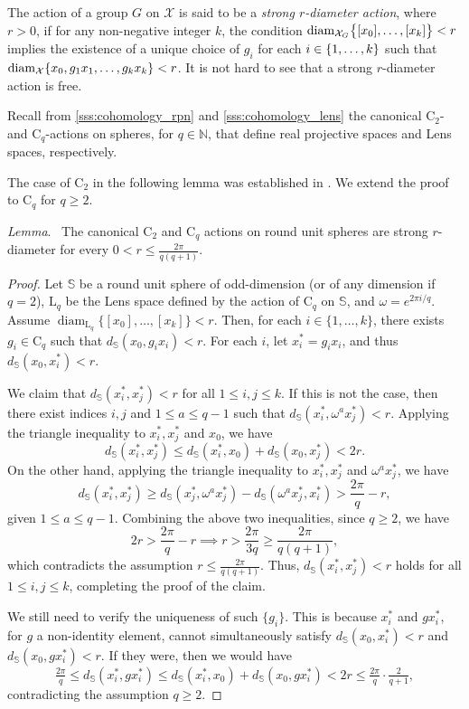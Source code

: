 \documentclass{amsart}
\makeatletter
\renewcommand\subsubsection{\@startsection{subsubsection}{3}
	\z@{.5\linespacing\@plus.7\linespacing}{0em}
	{\normalfont\itshape}}
\theoremstyle{definition}
\newcommand{\N}{\mathbb{N}}
\newcommand{\cyc}{\mathrm{C}}
\DeclarePairedDelimiter\set{\{}{\}}
\newcommand{\rL}{\mathrm{L}}
\newcommand{\cX}{\mathcal{X}}
\newcommand{\bS}{\mathbb{S}}
\newcommand{\darkblue}{\color{darkblue}}
\newcommand{\defn}[1]{{\darkblue \emph{#1}}}
\renewcommand{\lemma}{\medskip\noindent\textit{\darkblue Lemma}.\ }
\theoremstyle{theorem}
\newcommand{\diam}{\operatorname{diam}}
\providecommand{\DIFaddtex}[1]{{\protect\color{blue}\uwave{#1}}} %
\providecommand{\DIFdeltex}[1]{{\protect\color{red}\sout{#1}}}                      %
\providecommand{\DIFadd}[1]{\texorpdfstring{\DIFaddtex{#1}}{#1}} %
\providecommand{\DIFdel}[1]{\texorpdfstring{\DIFdeltex{#1}}{}} %
\renewcommand{\DIFadd}[1]{{\color{red}#1}}
\renewcommand{\DIFdel}[1]{{\color{deletedpurple}\ifmmode\oldmath{#1}\else\sout{#1}\fi}}
\newcommand{\oldmath}[1]{{\color{deletedpurple}\mathpalette\horizontalstrike{#1}}}
\newcommand{\horizontalstrike}[2]{\sbox0{$#1#2$}\rlap{\raisebox{.5\ht0}{\rule{\wd0}{.4pt}}}\usebox0}
\makeatother
\begin{document}
\subsubsection{}\label{sss:strong_r_action}

The action of a group $G$ on $\cX$ is said to be a \defn{strong $r$-diameter action}, where $r > 0$, if for any non-negative integer $k$, the condition $\diam_{\cX_G}\set[\big]{[x_0],\dots,[x_k]} < r$ implies the existence of a unique choice of $g_i$ for each $i \in \set{1,\dots,k}$ such that $\diam_{\cX}\set{x_0, g_1x_1, \dots, g_kx_k} < r$.
It is not hard to see that a strong $r$-diameter action is free.

Recall from \cref{sss:cohomology_rpn} and \cref{sss:cohomology_lens} the canonical $\cyc_2$- and $\cyc_q$-actions on spheres, for $q \in \N$, that define real projective spaces and Lens spaces, respectively.

The case of $\cyc_2$ in the following lemma was established in \cite[\DIFdel{Cor.}\DIFadd{Corollary}~4.3]{adams2022metric}.
We extend the proof to $\cyc_q$ for \(q \geq 2\).

\lemma
The canonical $\cyc_2$ and $\cyc_q$ actions on round unit spheres are strong $r$-diameter for every $0 < r \leq \tfrac{2\pi}{q(q+1)}$.

\begin{proof}
	Let $\bS$ be a round unit sphere of odd-dimension (or of any dimension if $q=2$), $\rL_q$ be the Lens space defined by the action of \(\cyc_q\) on \(\bS\), and $\omega = e^{2\pi i/q}$.
	Assume $\diam_{\rL_q}\{[x_0], \dots, [x_k]\} < r$.
	Then, for each $i \in \{1, \dots, k\}$, there exists $g_i \in \cyc_q$ such that $d_{\bS}(x_0, g_i x_i) < r$. For each $i$, let $x_i^* = g_i x_i$, and thus $d_{\bS}(x_0, x_i^*) < r$.

	We claim that $d_{\bS}(x_i^*, x_j^*) < r$ for all $1 \le i,j \le k$.
	If this is not the case, then there exist indices $i,j$ and $1 \leq a \leq q-1$ such that $d_{\bS}(x_i^*, \omega^a x_j^*) < r$.
	Applying the triangle inequality to $x_i^*, x_j^*$ and $x_0$, we have
	\[d_{\bS}(x_i^*, x_j^*) \leq d_{\bS}(x_i^*, x_0) + d_{\bS}(x_0, x_j^*) < 2r.\]
	On the other hand, applying the triangle inequality to $x_i^*, x_j^*$ and $\omega^a x_j^*$, we have
	\[
	d_{\bS}(x_i^*, x_j^*) \geq d_{\bS}(x_j^*, \omega^a x_j^*) - d_{\bS}(\omega^a x_j^*, x_i^*) > \frac{2\pi}{q} - r,
	\]
	given $1 \leq a \leq q-1$.
	Combining the above two inequalities, since $q \geq 2$, we have
	\[
	2r > \frac{2\pi}{q} - r \implies r > \frac{2\pi}{3q} \geq \frac{2\pi}{q(q+1)},
	\]
	which contradicts the assumption $r \le \frac{2\pi}{q(q+1)}$.
	Thus, $d_{\bS}(x_i^*, x_j^*) < r$ holds for all $1 \le i,j \le k$, completing the proof of the claim.

	We still need to verify the uniqueness of such $\{g_i\}$.
	This is because $x_i^*$ and $gx_i^*$, for $g$ a non-identity element, cannot simultaneously satisfy $d_{\bS}(x_0, x_i^*) < r$ and $d_{\bS}(x_0, gx_i^*) < r$.
	If they were, then we would have
	\[\tfrac{2\pi}{q} \leq d_{\bS}(x_i^*, gx_i^*) \leq d_{\bS}(x_i^*, x_0) + d_{\bS}(x_0, gx_i^*) < 2r \leq \tfrac{2\pi}{q} \cdot \tfrac{2}{q+1},
	\]
	contradicting the assumption $q \geq 2$.
\end{proof}
\end{document}
